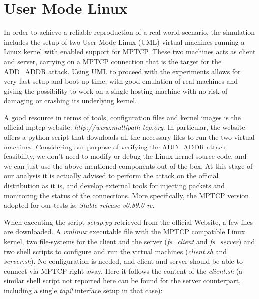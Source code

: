 \section{User Mode Linux}
In order to achieve a reliable reproduction of a real world scenario, the simulation includes the setup of two User Mode Linux (UML) virtual machines running a Linux kernel with enabled support for MPTCP. These two machines acts as client and server, carrying on a MPTCP connection that is the target for the ADD\_ADDR attack. 
Using UML to proceed with the experiments allows for very fast setup and boot-up time, with good emulation of real machines and giving the possibility to work on a single hosting machine with no risk of damaging or crashing its underlying kernel.

A good resource in terms of tools, configuration files and kernel images is the official mptcp website:
\textit{http://www.multipath-tcp.org}. In particular, the website offers a python script that downloads all the necessary files to run the two virtual machines. Considering our purpose of verifying the ADD\_ADDR attack feasibility, we don't need to modify or debug the Linux kernel source code, and we can just use the above mentioned components out of the box. At this stage of our analysis it is actually advised to perform the attack on the official distribution as it is, and develop external tools for injecting packets and monitoring the status of the connections. More specifically, the MPTCP version adopted for our tests is: \textit{Stable release v0.89.0-rc}.

When executing the script \textit{setup.py} retrieved from the official Website, a few files are downloaded. A \textit{vmlinux} executable file with the MPTCP compatible Linux kernel, two file-systems for the client and the server (\textit{fs\_client} and \textit{fs\_server}) and two shell scripts to configure and run the virtual machines (\textit{client.sh} and \textit{server.sh}). No configuration is needed, and client and server should be able to connect via MPTCP right away.
Here it follows the content of the \textit{client.sh} (a similar shell script not reported here can be found for the server counterpart, including a single \textit{tap2} interface setup in that case):


